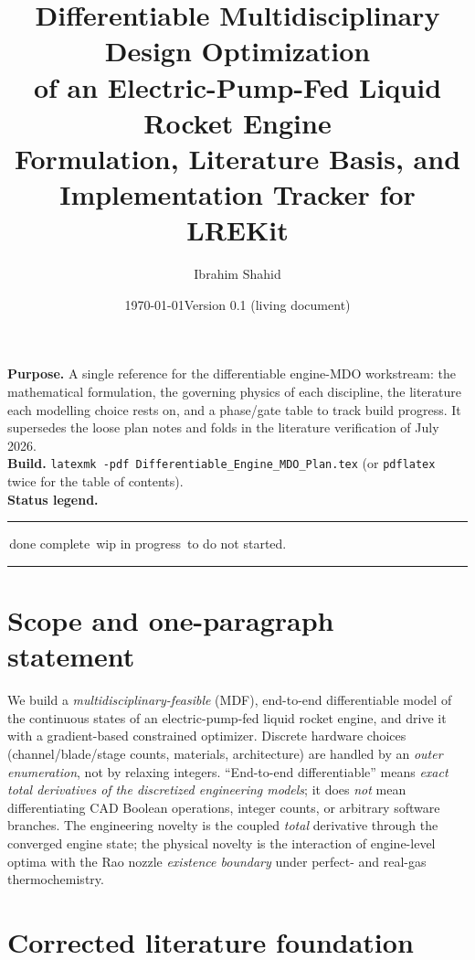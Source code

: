\documentclass[11pt]{article}
\title{\vspace{-1.2cm}\textbf{\color{accentdark}Differentiable Multidisciplinary Design Optimization\\[2pt]
of an Electric-Pump-Fed Liquid Rocket Engine}\\[6pt]
\large Formulation, Literature Basis, and Implementation Tracker for LREKit}
\author{Ibrahim Shahid}
\date{\today\quad\textbullet\quad Version 0.1 (living document)}
\newcommand{\cmd}[1]{\nolinkurl{#1}}
\newcommand{\badge}[2]{{\color{#1}\rule[-0.05ex]{1.0ex}{1.0ex}}\,\small #2}
\newcommand{\stDone}{\badge{okgreen}{done}}
\newcommand{\stWip}{\badge{wiporange}{wip}}
\newcommand{\stTodo}{\badge{rulegray}{to do}}
\begin{document}
\maketitle
\thispagestyle{fancy}

\begin{keybox}
\textbf{Purpose.} A single reference for the differentiable engine-MDO workstream:
the mathematical formulation, the governing physics of each discipline, the
literature each modelling choice rests on, and a phase/gate table to track
build progress. It supersedes the loose plan notes and folds in the
literature verification of July 2026.\\[3pt]
\textbf{Build.} \cmd{latexmk -pdf Differentiable_Engine_MDO_Plan.tex}
(or \cmd{pdflatex} twice for the table of contents).\\[3pt]
\textbf{Status legend.} \stDone{} complete \quad \stWip{} in progress \quad \stTodo{} not started.
\end{keybox}

\tableofcontents
\vspace{4pt}\hrule

\section{Scope and one-paragraph statement}

We build a \emph{multidisciplinary-feasible} (MDF), end-to-end differentiable
model of the continuous states of an electric-pump-fed liquid rocket engine,
and drive it with a gradient-based constrained optimizer. Discrete hardware
choices (channel/blade/stage counts, materials, architecture) are handled by an
\emph{outer enumeration}, not by relaxing integers. ``End-to-end differentiable''
means \emph{exact total derivatives of the discretized engineering models};
it does \emph{not} mean differentiating CAD Boolean operations, integer counts,
or arbitrary software branches. The engineering novelty is the coupled
\emph{total} derivative through the converged engine state; the physical novelty
is the interaction of engine-level optima with the Rao nozzle
\emph{existence boundary} under perfect- and real-gas thermochemistry.

\section{Corrected literature foundation}
\label{sec:lit}
\end{document}

